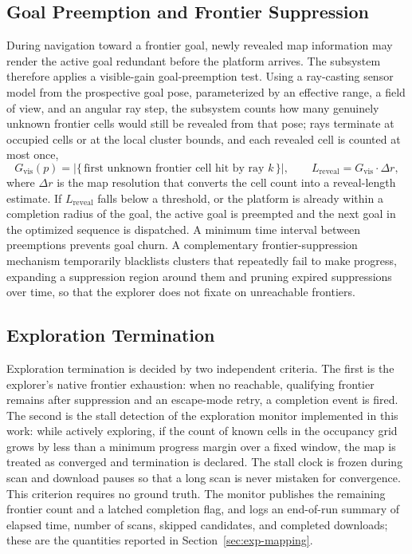 \subsection{Goal Preemption and Frontier Suppression}
\label{subsec:preemption}

During navigation toward a frontier goal, newly revealed map information may
render the active goal redundant before the platform arrives. The subsystem
therefore applies a visible-gain goal-preemption test. Using a ray-casting
sensor model from the prospective goal pose, parameterized by an effective
range, a field of view, and an angular ray step, the subsystem counts how many
genuinely unknown frontier cells would still be revealed from that pose; rays
terminate at occupied cells or at the local cluster bounds, and each revealed
cell is counted at most once,
\begin{equation}
  G_{\mathrm{vis}}(p) = \bigl\lvert\{\,\text{first unknown frontier cell hit by ray }k\,\}\bigr\rvert,
  \qquad L_{\mathrm{reveal}} = G_{\mathrm{vis}}\cdot\Delta r,
  \label{eq:preempt}
\end{equation}
where $\Delta r$ is the map resolution that converts the cell count into a
reveal-length estimate. If $L_{\mathrm{reveal}}$ falls below a threshold, or
the platform is already within a completion radius of the goal, the active
goal is preempted and the next goal in the optimized sequence is dispatched. A
minimum time interval between preemptions prevents goal churn. A complementary
frontier-suppression mechanism temporarily blacklists clusters that repeatedly
fail to make progress, expanding a suppression region around them and pruning
expired suppressions over time, so that the explorer does not fixate on
unreachable frontiers.

\subsection{Exploration Termination}
\label{subsec:termination}

Exploration termination is decided by two independent criteria. The first is
the explorer's native frontier exhaustion: when no reachable, qualifying
frontier remains after suppression and an escape-mode retry, a completion event
is fired. The second is the stall detection of the exploration monitor
implemented in this work: while actively exploring, if the count of known cells
in the occupancy grid grows by less than a minimum progress margin over a fixed
window, the map is treated as converged and termination is declared. The stall
clock is frozen during scan and download pauses so that a long scan is never
mistaken for convergence. This criterion requires no ground truth. The monitor
publishes the remaining frontier count and a latched completion flag, and logs
an end-of-run summary of elapsed time, number of scans, skipped candidates, and
completed downloads; these are the quantities reported in
Section~\ref{sec:exp-mapping}.

